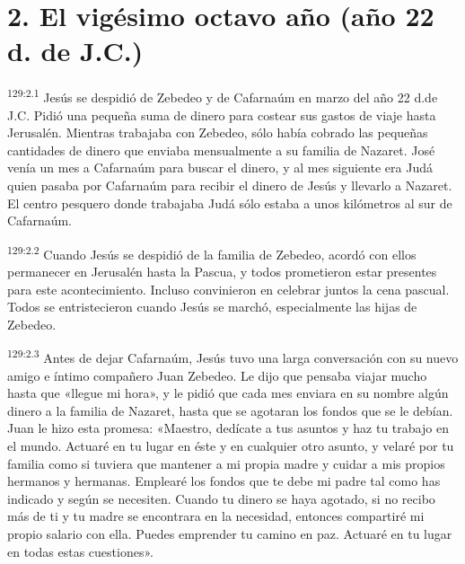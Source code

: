 \section*{2. El vigésimo octavo año (año 22 d. de J.C.)}
\par
\textsuperscript{129:2.1} Jesús se despidió de Zebedeo y de Cafarnaúm en marzo del año 22 d.de J.C. Pidió una pequeña suma de dinero para costear sus gastos de viaje hasta Jerusalén. Mientras trabajaba con Zebedeo, sólo había cobrado las pequeñas cantidades de dinero que enviaba mensualmente a su familia de Nazaret. José venía un mes a Cafarnaúm para buscar el dinero, y al mes siguiente era Judá quien pasaba por Cafarnaúm para recibir el dinero de Jesús y llevarlo a Nazaret. El centro pesquero donde trabajaba Judá sólo estaba a unos kilómetros al sur de Cafarnaúm.

\par
\textsuperscript{129:2.2} Cuando Jesús se despidió de la familia de Zebedeo, acordó con ellos permanecer en Jerusalén hasta la Pascua, y todos prometieron estar presentes para este acontecimiento. Incluso convinieron en celebrar juntos la cena pascual. Todos se entristecieron cuando Jesús se marchó, especialmente las hijas de Zebedeo.

\par
\textsuperscript{129:2.3} Antes de dejar Cafarnaúm, Jesús tuvo una larga conversación con su nuevo amigo e íntimo compañero Juan Zebedeo. Le dijo que pensaba viajar mucho hasta que «llegue mi hora», y le pidió que cada mes enviara en su nombre algún dinero a la familia de Nazaret, hasta que se agotaran los fondos que se le debían. Juan le hizo esta promesa: «Maestro, dedícate a tus asuntos y haz tu trabajo en el mundo. Actuaré en tu lugar en éste y en cualquier otro asunto, y velaré por tu familia como si tuviera que mantener a mi propia madre y cuidar a mis propios hermanos y hermanas. Emplearé los fondos que te debe mi padre tal como has indicado y según se necesiten. Cuando tu dinero se haya agotado, si no recibo más de ti y tu madre se encontrara en la necesidad, entonces compartiré mi propio salario con ella. Puedes emprender tu camino en paz. Actuaré en tu lugar en todas estas cuestiones».

